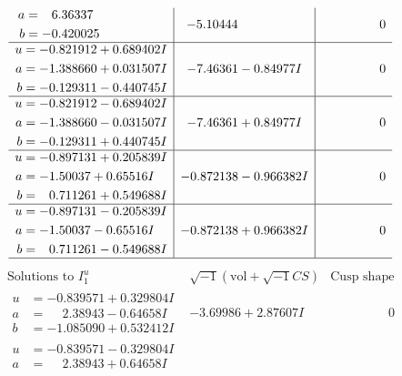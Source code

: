 \documentclass[1p]{elsarticle_modified}
\theoremstyle{definition}
\newcommand{\I}{\sqrt{-1}}
\begin{document}
$$\begin{array}{c|c|c}
\begin{aligned}
a &= \phantom{-}6.36337\phantom{ +0.000000I} \\
b &= -0.420025\phantom{ +0.000000I}\end{aligned}
 & -5.10444\phantom{ +0.000000I} & \phantom{-0.000000 } 0 \\ \hline\begin{aligned}
u &= -0.821912 + 0.689402 I \\
a &= -1.388660 + 0.031507 I \\
b &= -0.129311 - 0.440745 I\end{aligned}
 & -7.46361 - 0.84977 I & \phantom{-0.000000 } 0 \\ \hline\begin{aligned}
u &= -0.821912 - 0.689402 I \\
a &= -1.388660 - 0.031507 I \\
b &= -0.129311 + 0.440745 I\end{aligned}
 & -7.46361 + 0.84977 I & \phantom{-0.000000 } 0 \\ \hline\begin{aligned}
u &= -0.897131 + 0.205839 I \\
a &= -1.50037 + 0.65516 I \\
b &= \phantom{-}0.711261 + 0.549688 I\end{aligned}
 & -0.872138 - 0.966382 I & \phantom{-0.000000 } 0 \\ \hline\begin{aligned}
u &= -0.897131 - 0.205839 I \\
a &= -1.50037 - 0.65516 I \\
b &= \phantom{-}0.711261 - 0.549688 I\end{aligned}
 & -0.872138 + 0.966382 I & \phantom{-0.000000 } 0\\
 \hline 
 \end{array}$$\newpage$$\begin{array}{c|c|c}  
\text{Solutions to }I^u_{1}& \I (\text{vol} + \sqrt{-1}CS) & \text{Cusp shape}\\
 \hline 
\begin{aligned}
u &= -0.839571 + 0.329804 I \\
a &= \phantom{-}2.38943 - 0.64658 I \\
b &= -1.085090 + 0.532412 I\end{aligned}
 & -3.69986 + 2.87607 I & \phantom{-0.000000 } 0 \\ \hline\begin{aligned}
u &= -0.839571 - 0.329804 I \\
a &= \phantom{-}2.38943 + 0.64658 I \\

\end{aligned}
\end{array}$$
\end{document}
